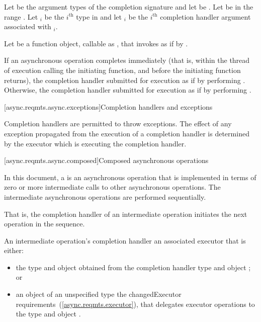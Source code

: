 \pnum
Let  be the argument types of the completion signature  and let  be . Let  be in the range . Let $_i$ be the $i^\text{th}$ type in  and let $_i$ be the $i^\text{th}$ completion handler argument associated with $_i$.

\pnum
Let  be a function object, callable as , that invokes  as if by .

\pnum
If an asynchronous operation completes immediately (that is, within the thread of execution calling the initiating function, and before the initiating function returns), the completion handler  submitted for execution as if by performing . Otherwise, the completion handler  submitted for execution as if by performing .



[async.reqmts.async.exceptions]{Completion handlers and exceptions}

\pnum
 Completion handlers are permitted to throw exceptions. The effect of any exception propagated from the execution of a completion handler is determined by the executor which is executing the completion handler.



[async.reqmts.async.composed]{Composed asynchronous operations}

\pnum
In this document, a  is an asynchronous operation that is implemented in terms of zero or more intermediate calls to other asynchronous operations. The intermediate asynchronous operations are performed sequentially. \begin{note} That is, the completion handler of an intermediate operation initiates the next operation in the sequence. \end{note}

An intermediate operation's completion handler  an associated executor that is either:

\begin{itemize}
\item
the type  and object  obtained from the completion handler type  and object ; or

\item
an object of an unspecified type  the changed{Executor}{} requirements~(\ref{async.reqmts.executor}), that delegates executor operations to the type  and object .
\end{itemize}

